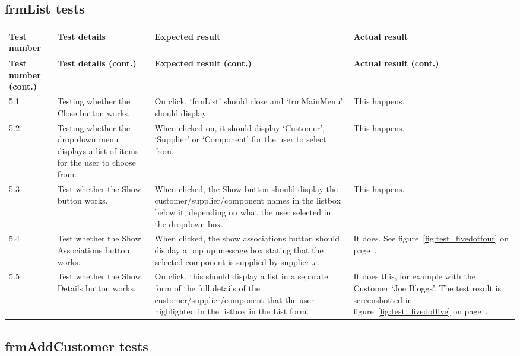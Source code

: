 \subsection{frmList tests}

\begin{longtable}{ | p{2cm} | p{4cm} | p{4cm} | p{4cm} | }
	\hline
	\textbf{Test number} & \textbf{Test details} & \textbf{Expected result} & \textbf{Actual result}\\
	\endfirsthead
	\hline
	\textbf{Test number (cont.)} & \textbf{Test details (cont.)} & \textbf{Expected result (cont.)} & \textbf{Actual result (cont.)}\\
	\endhead
	\hline
	5.1 & Testing whether the Close button works. & On click, `frmList' should close and `frmMainMenu' should display. & This happens.\\
	\hline
	5.2 & Testing whether the drop down menu displays a list of items for the user to choose from. & When clicked on, it should display `Customer', `Supplier' or `Component' for the user to select from. & This happens.\\
	\hline
	5.3 & Test whether the Show button works. & When clicked, the Show button should display the customer\slash supplier\slash component names in the listbox below it, depending on what the user selected in the dropdown box. & This happens.\\
	\hline
	5.4 & Test whether the Show Associations button works. & When clicked, the show associations button should display a pop up message box stating that the selected component is supplied by supplier $x$. & It does.  See figure~\ref{fig:test_fivedotfour} on page~\pageref{fig:test_fivedotfour}.\\
	\hline
	5.5 & Test whether the Show Details button works. & On click, this should display a list in a separate form of the full details of the customer\slash supplier\slash component that the user highlighted in the listbox in the List form. & It does this, for example with the Customer `Joe Bloggs'.  The test result is screenshotted in figure~\ref{fig:test_fivedotfive} on page~\pageref{fig:test_fivedotfive}.\\
	\hline
\end{longtable}

\subsection{frmAddCustomer tests}

